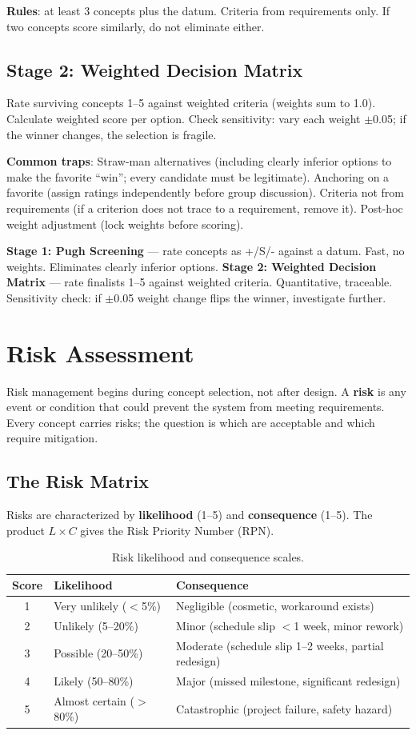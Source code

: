 \documentclass[11pt,letterpaper,twoside,openany]{book}
\begin{document}
\textbf{Rules}: at least 3 concepts plus the datum. Criteria from requirements only. If two concepts score similarly, do not eliminate either.

\subsection{Stage 2: Weighted Decision Matrix}
Rate surviving concepts 1--5 against weighted criteria (weights sum to 1.0). Calculate weighted score per option. Check sensitivity: vary each weight $\pm$0.05; if the winner changes, the selection is fragile.

\textbf{Common traps}: Straw-man alternatives (including clearly inferior options to make the favorite ``win''; every candidate must be legitimate). Anchoring on a favorite (assign ratings independently before group discussion). Criteria not from requirements (if a criterion does not trace to a requirement, remove it). Post-hoc weight adjustment (lock weights before scoring).

\textbf{Stage 1: Pugh Screening} — rate concepts as +/S/- against a datum. Fast, no weights. Eliminates clearly inferior options. \textbf{Stage 2: Weighted Decision Matrix} — rate finalists 1--5 against weighted criteria. Quantitative, traceable. Sensitivity check: if $\pm$0.05 weight change flips the winner, investigate further.


\section{Risk Assessment}
Risk management begins during concept selection, not after design. A \textbf{risk} is any event or condition that could prevent the system from meeting requirements. Every concept carries risks; the question is which are acceptable and which require mitigation.

\subsection{The Risk Matrix}
Risks are characterized by \textbf{likelihood} (1--5) and \textbf{consequence} (1--5). The product $L \times C$ gives the Risk Priority Number (RPN).

\begin{table}[htbp]\centering\small
\begin{tabularx}{\textwidth}{c X X}
\toprule
\textbf{Score} & \textbf{Likelihood} & \textbf{Consequence} \\
\midrule
1 & Very unlikely ($<$5\%) & Negligible (cosmetic, workaround exists) \\
2 & Unlikely (5--20\%) & Minor (schedule slip $<$1 week, minor rework) \\
3 & Possible (20--50\%) & Moderate (schedule slip 1--2 weeks, partial redesign) \\
4 & Likely (50--80\%) & Major (missed milestone, significant redesign) \\
5 & Almost certain ($>$80\%) & Catastrophic (project failure, safety hazard) \\
\bottomrule
\end{tabularx}
\caption{Risk likelihood and consequence scales.}
\end{table}
\end{document}
